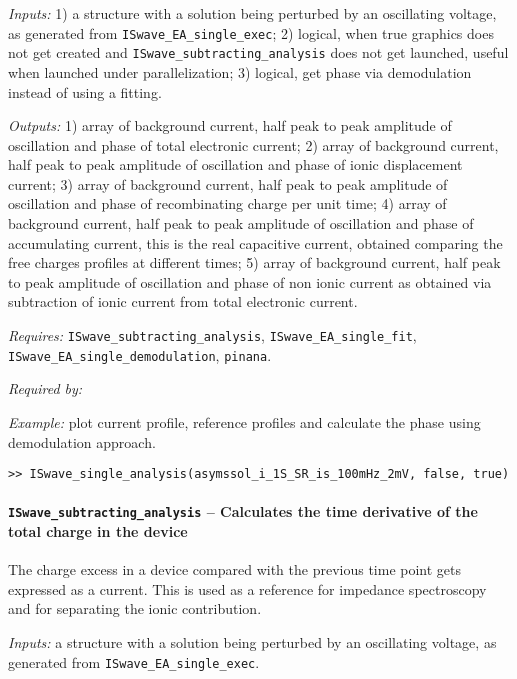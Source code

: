\textit{Inputs:} 1) a structure with a solution being perturbed by an
     oscillating voltage, as generated from \texttt{ISwave\_EA\_single\_exec};
   2) logical, when true graphics does not get created and
     \texttt{ISwave\_subtracting\_analysis} does not get launched, useful when
     launched under parallelization;
   3) logical, get phase via demodulation instead of using a fitting.

\textit{Outputs:} 1) array of background current, half peak to peak amplitude of
     oscillation and phase of total electronic current;
   2) array of background current, half peak to peak amplitude of
     oscillation and phase of ionic displacement current;
   3) array of background current, half peak to peak amplitude of
     oscillation and phase of recombinating charge per unit time;
   4) array of background current, half peak to peak amplitude of
     oscillation and phase of accumulating current, this is the real
     capacitive current, obtained comparing the free charges profiles at
     different times;
   5) array of background current, half peak to peak amplitude of
     oscillation and phase of non ionic current as obtained via
     subtraction of ionic current from total electronic current.

\textit{Requires:} \texttt{ISwave\_subtracting\_analysis}, \texttt{ISwave\_EA\_single\_fit}, \texttt{ISwave\_EA\_single\_demodulation}, \texttt{pinana}.

\textit{Required by:} 

\textit{Example:} plot current profile, reference profiles and calculate the phase using demodulation approach.
\begin{lstlisting}[style=Matlab-editor]
>> ISwave_single_analysis(asymssol_i_1S_SR_is_100mHz_2mV, false, true)
\end{lstlisting}

\paragraph{\texttt{ISwave\_subtracting\_analysis} -- Calculates the time derivative of the total charge in the device}
The charge excess in a device compared with the previous time point gets expressed as a current.
This is used as a reference for impedance spectroscopy and for separating the ionic contribution.

\textit{Inputs:} a structure with a solution being perturbed by an
oscillating voltage, as generated from \texttt{ISwave\_EA\_single\_exec}.

